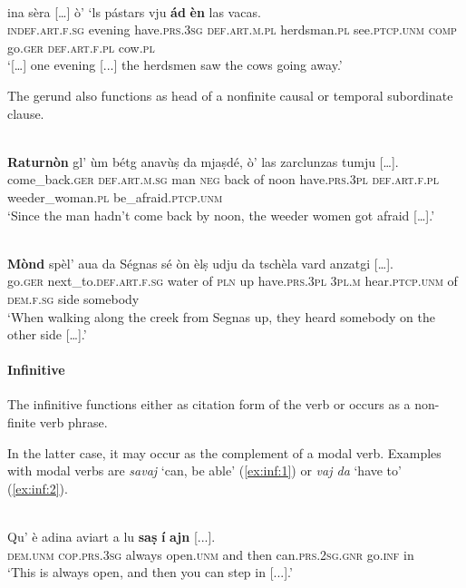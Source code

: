 \ea\label{}
 {\citealt[28]{Büchli1966}}\\
\gll   [...] ina sèra […] ò’ ‘ls pástars vju \textbf{ád} \textbf{èn} las vacas.\\
{} \textsc{indef.art.f.sg} evening {} have.\textsc{prs.3sg} \textsc{def.art.m.pl} herdsman.\textsc{pl} see.\textsc{ptcp.unm} \textsc{comp} go.\textsc{ger} \textsc{def.art.f.pl} cow.\textsc{pl} \\
\glt `[…] one evening [...] the herdsmen saw the cows going away.'
\z

The gerund also functions as head of a nonfinite causal or temporal subordinate clause.

\ea\label{}
 {\citealt[82]{Büchli1966}}\\
\gll   \textbf{Raturnòn} gl' ùm bétg anavùṣ da mjaṣdé, ò’ las zarclunzas tumju […].\\
come\_back.\textsc{ger} \textsc{def.art.m.sg} man \textsc{neg} back of noon have.\textsc{prs.3pl} \textsc{def.art.f.pl} weeder\_woman.\textsc{pl} be\_afraid.\textsc{ptcp.unm}\\
\glt `Since the man hadn’t come back by noon, the weeder women got afraid […].'
\z

\ea\label{}
 {\citealt[88]{Büchli1966}}\\
\gll    \textbf{Mònd} spèl’ aua da Ségnas sé òn èlṣ udju da tschèla vard anzatgi […].\\
     go.\textsc{ger} next\_to.\textsc{def.art.f.sg} water of  \textsc{pln} up have.\textsc{prs.3pl} \textsc{3pl.m} hear.\textsc{ptcp.unm} of \textsc{dem.f.sg} side somebody \\
\glt `When walking along the creek from Segnas up, they heard somebody on the other side […].'
\z


\paragraph{Infinitive}
The infinitive functions either as citation form of the verb or occurs as a non-finite verb phrase.

In the latter case, it may occur as the complement of a modal verb. Examples with modal verbs are \textit{savaj} `can, be able' (\ref{ex:inf:1}) or \textit{vaj da} `have to' (\ref{ex:inf:2}).

\ea\label{ex:inf:1}
\\
\gll  Qu’ è adina aviart a lu \textbf{saṣ} \textbf{í} \textbf{ajn} [...].\\
\textsc{dem.unm} \textsc{cop.prs.3sg} always open.\textsc{unm} and then can.\textsc{prs.2sg.gnr} go.\textsc{inf} in\\
\glt `This is always open, and then you can step in [...].'
\z

